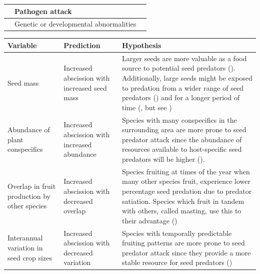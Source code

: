 \begin{table}
\begin{tabular}{|p{4cm}p{4cm}p{12cm}|}
         & Pathogen attack & \cite{phillipsImmatureNutfallCoconuts1940,carterInjuriesPlantsCaused1939,akinsanmiFruitAbscissionMacadamia2016,teviotdaleAbscissionKernelQuality1997} \\ \hline
         & Genetic or developmental abnormalities & \cite{bradburyComparativeStudyDeveloping1929,krausSelfsterilityProblem1915,forinoEmbryosacsFrequencyOvules1987} \\ \hline
\end{tabular}
\label{tab:causes}
\end{table}



\begin{table}
\small
\begin{tabular}{|p{4cm}p{4cm}p{13cm}|}
\hline
        \textbf{Variable} & \textbf{Prediction} & \textbf{Hypothesis} \\ \hline
        Seed mass & Increased abscission with increased seed mass & Larger seeds are more valuable as a food source to potential seed predators (\cite{moegenburgSabalPalmettoSeed1996, fennerRelationshipCapitulumSize2002}). Additionally, large seeds might be exposed to predation from a wider range of seed predators (\cite{greigPredispersalSeedPredation1993, mucunguziBruchidsSurvivalAcacia1995}) and for a longer period of time (\cite{molesLatitudeSeedPredation2003}, but see \cite {molesSmallseededSpeciesHave2003}) \\ \hline
        Abundance of plant conspecifics & Increased abscission with increased abundance & Species with many conspecifics in the surrounding area are more prone to seed predator attack since the abundance of resources available to host-specific seed predators will be higher (\cite{janzenHostPlantsIslands1968}). \\ \hline
        Overlap in fruit production by other species & Increased abscission with decreased overlap & Species fruiting at times of the year when many other species fruit, experience lower percentage seed predation due to predator satiation. Species which fruit in tandem with others, called masting, use this to their advantage (\cite{kellyMastSeedingPerennial2002, kellyEvolutionaryEcologyMast1994, janzenSeedPredationAnimals1971}) \\ \hline
        Interannual variation in seed crop sizes & Increased abscission with decreased variation & Species with temporally predictable fruiting patterns are more prone to seed predator attack since they provide a more stable resource for seed predators (\cite{janzenSeedPredationAnimals1971,janzenWhyBamboosWait1976}) \\ \hline

\end{tabular}
\end{table}
